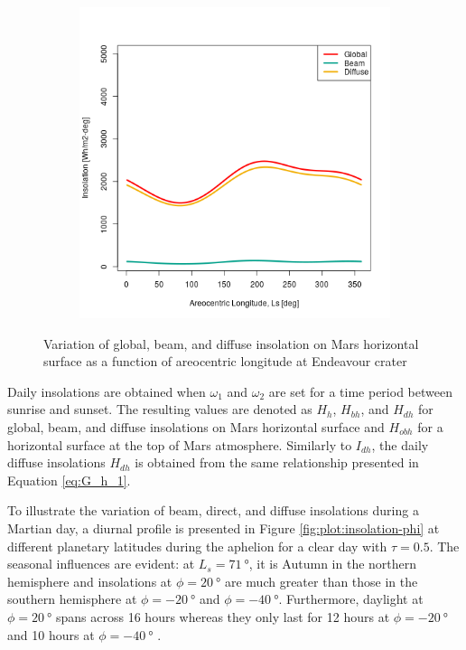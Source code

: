 \begin{figure}[H]
\begin{subfigure}[t]{\subfigureWidth}
  		\label{fig:sub:insolation-ls-tau-factor-2}
  	\end{subfigure}\hfill
	   \begin{subfigure}[t]{\subfigureWidth}
      \centering
  		\includegraphics[height=\graphicsHeight]{sections/martian-environment/plots/variation-of-global-beam-and-diffuse-insolation-on-mars-horizontal-surface-as-a-function-of-areocentric-longitude-for-tau3-and-phi205.png}
  		\label{fig:sub:insolation-ls-tau-factor-3}
	   \end{subfigure}\hfill
	\caption{Variation of global, beam, and diffuse insolation on Mars horizontal surface as a function of areocentric longitude at Endeavour crater}
	\label{fig:plot:insolation-ls}
\vspace{-2ex}
\end{figure}

Daily insolations are obtained when $\omega_1$ and $\omega_2$ are set for a time period between sunrise and sunset. The resulting values are denoted as $H_{h}$, $H_{bh}$, and $H_{dh}$ for global, beam, and diffuse insolations on Mars horizontal surface and $H_{obh}$ for a horizontal surface at the top of Mars atmosphere. Similarly to $I_{dh}$, the daily diffuse insolations $H_{dh}$ is obtained from the same relationship presented in Equation \ref{eq:G_h_1}.

To illustrate the variation of beam, direct, and diffuse insolations during a Martian day, a diurnal profile is presented in Figure \ref{fig:plot:insolation-phi} at different planetary latitudes during the aphelion for a clear day with $\tau = 0.5$. The seasonal influences are evident: at $L_{s} = \SI{71}{\degree}$, it is Autumn in the northern hemisphere and insolations at $\phi = \SI{20}{\degree}$ are much greater than those in the southern hemisphere at $\phi = \SI{-20}{\degree}$ and $\phi = \SI{-40}{\degree}$. Furthermore, daylight at $\phi = \SI{20}{\degree}$ spans across 16 hours whereas they only last for 12 hours at $\phi = \SI{-20}{\degree}$ and 10 hours at $\phi = \SI{-40}{\degree}$ .


